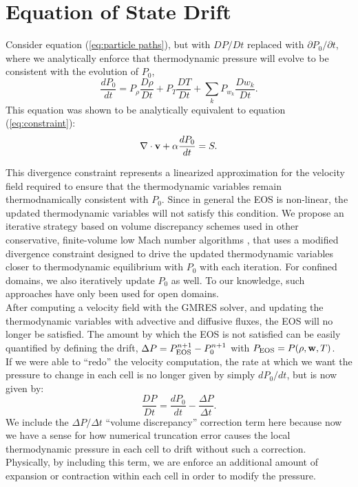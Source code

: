 \documentclass[final]{siamltex}
\def\vb {{\bf v}}
\def\wb {{\bf w}}
\begin{document}
\section{Equation of State Drift}
Consider equation (\ref{eq:particle paths}), but with
$DP/Dt$ replaced with $\partial P_0/\partial t$,
where we analytically enforce that
thermodynamic pressure will evolve to be consistent with the evolution of $P_0$,
\begin{equation}
\frac{dP_0}{dt} = P_\rho\frac{D\rho}{Dt} + P_T\frac{DT}{Dt} + \sum_kP_{w_k}\frac{Dw_k}{Dt}.
\end{equation}
This equation was shown to be analytically equivalent to equation (\ref{eq:constraint}):
\begin{equation}
\nabla\cdot\vb + \alpha\frac{dP_0}{dt} = S.
\end{equation}

This divergence constraint represents a linearized approximation for the velocity 
field required to ensure that the thermodynamic variables remain thermodnamically
consistent with $P_0$.  Since in general the EOS is non-linear, the updated 
thermodynamic variables will not
satisfy this condition.  We propose an iterative strategy based on
volume discrepancy schemes used
in other conservative, finite-volume low Mach number algorithms
\cite{Pember:1998,XRB}, that
uses a modified divergence constraint designed to drive the updated 
thermodynamic variables closer to thermodynamic equilibrium with $P_0$ with each iteration.
For confined domains, we also iteratively update $P_0$ as well.  To our knowledge,
such approaches have only been used for open domains.\\

After computing a velocity field with the GMRES solver, and updating the thermodynamic
variables with advective and diffusive fluxes, the EOS will no longer be satisfied.
The amount by which the EOS is not satisfied can be easily quantified by defining
the drift, $\Delta P = P_{\rm EOS}^{n+1} - P_0^{n+1}$ with $P_{\rm EOS} = P(\rho,\wb,T)$.\\

If we were able to ``redo'' the velocity computation, the rate at which we want the 
pressure to change in each cell is no longer given
by simply $dP_0/dt$, but is now given by:
\begin{equation}
\frac{DP}{Dt} = \frac{dP_0}{dt} - \frac{\Delta P}{\Delta t}.\label{eq:DPDt}
\end{equation}
We include the $\Delta P/\Delta t$ ``volume discrepancy'' correction term here because 
now we have a sense for how numerical truncation error causes the local thermodynamic pressure in 
each cell to drift without such a correction.  Physically, by including this term, we are enforce 
an additional amount of expansion or contraction within each cell in order to modify 
the pressure.  
\end{document}
